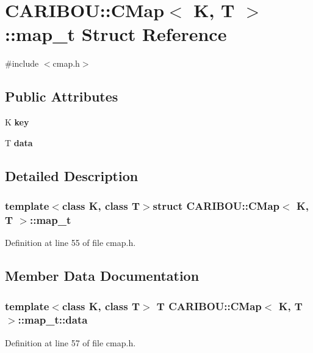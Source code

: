 \section{C\-A\-R\-I\-B\-O\-U\-:\-:C\-Map$<$ K, T $>$\-:\-:map\-\_\-t Struct Reference}
\label{struct_c_a_r_i_b_o_u_1_1_c_map_1_1map__t}


{\ttfamily \#include $<$cmap.\-h$>$}

\subsection*{Public Attributes}
\begin{DoxyCompactItemize}
\item 
K {\bf key}
\item 
T {\bf data}
\end{DoxyCompactItemize}


\subsection{Detailed Description}
\subsubsection*{template$<$class K, class T$>$struct C\-A\-R\-I\-B\-O\-U\-::\-C\-Map$<$ K, T $>$\-::map\-\_\-t}



Definition at line 55 of file cmap.\-h.



\subsection{Member Data Documentation}
\subsubsection[{data}]{\setlength{\rightskip}{0pt plus 5cm}template$<$class K, class T$>$ T {\bf C\-A\-R\-I\-B\-O\-U\-::\-C\-Map}$<$ K, T $>$\-::map\-\_\-t\-::data}\label{struct_c_a_r_i_b_o_u_1_1_c_map_1_1map__t_a61811c822bd4a20b72e10e7b570d40f2}


Definition at line 57 of file cmap.\-h.

